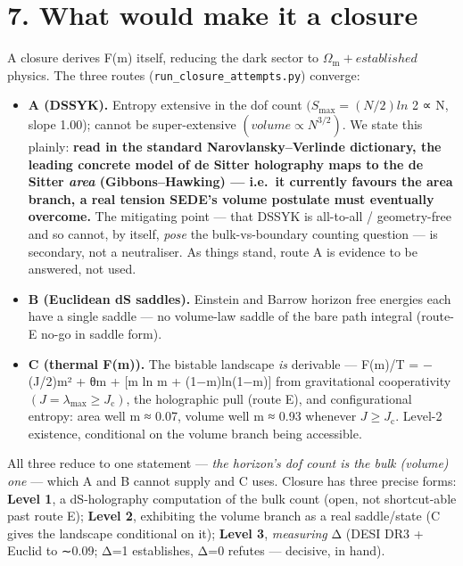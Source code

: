 \documentclass[
  10pt,
]{article}
\providecommand{\tightlist}{%
  \setlength{\itemsep}{0pt}\setlength{\parskip}{0pt}}
\begin{document}
\section{7. What would make it a
closure}\label{what-would-make-it-a-closure}

A closure derives F(m) itself, reducing the dark sector to
\(\Omega _{\mathrm{m}} + established\) physics. The three routes
(\texttt{run\_closure\_attempts.py}) converge:

\begin{itemize}
\tightlist
\item
  \textbf{A (DSSYK).} Entropy extensive in the dof count
  \((S_{\mathrm{max}} = (N/2)ln\) 2 ∝ N, slope 1.00); cannot be
  super-extensive \((volume \propto  N^{3/2})\). We state this plainly:
  \textbf{read in the standard Narovlansky--Verlinde dictionary, the
  leading concrete model of de Sitter holography maps to the de Sitter
  \emph{area} (Gibbons--Hawking) --- i.e.~it currently favours the area
  branch, a real tension SEDE's volume postulate must eventually
  overcome.} The mitigating point --- that DSSYK is all-to-all /
  geometry-free and so cannot, by itself, \emph{pose} the
  bulk-vs-boundary counting question --- is secondary, not a
  neutraliser. As things stand, route A is evidence to be answered, not
  used.
\item
  \textbf{B (Euclidean dS saddles).} Einstein and Barrow horizon free
  energies each have a single saddle --- no volume-law saddle of the
  bare path integral (route-E no-go in saddle form).
\item
  \textbf{C (thermal F(m)).} The bistable landscape \emph{is} derivable
  --- F(m)/T = −(J/2)m² + θm + {[}m ln m + (1−m)ln(1−m){]} from
  gravitational cooperativity
  \((J = \lambda _{\mathrm{max}} \geq  J_{\mathrm{c}})\), the
  holographic pull (route E), and configurational entropy: area well m ≈
  0.07, volume well m ≈ 0.93 whenever \(J \geq  J_{\mathrm{c}}\).
  Level-2 existence, conditional on the volume branch being accessible.
\end{itemize}

All three reduce to one statement --- \emph{the horizon's dof count is
the bulk (volume) one} --- which A and B cannot supply and C uses.
Closure has three precise forms: \textbf{Level 1}, a dS-holography
computation of the bulk count (open, not shortcut-able past route E);
\textbf{Level 2}, exhibiting the volume branch as a real saddle/state (C
gives the landscape conditional on it); \textbf{Level 3},
\emph{measuring} Δ (DESI DR3 + Euclid to ∼0.09; Δ=1 establishes, Δ=0
refutes --- decisive, in hand).
\end{document}
